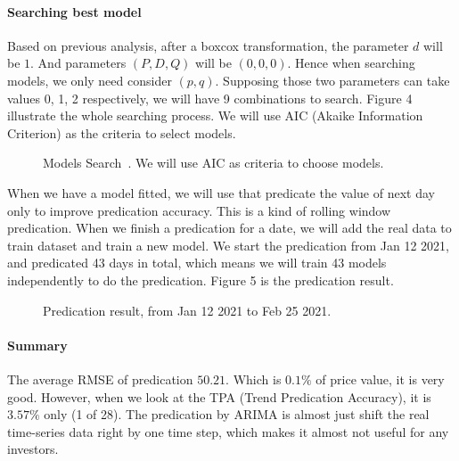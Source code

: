 \documentclass[10pt,twocolumn,letterpaper]{article}
\begin{document}
\paragraph{Searching best model}
Based on previous analysis, after a boxcox transformation, the parameter $d$ will be $1$. And parameters $(P, D, Q)$ will be $(0, 0, 0)$. Hence when searching models, we only need consider $(p, q)$. Supposing those two parameters can take values 0, 1, 2 respectively, we will have 9 combinations to search. Figure 4 illustrate the whole searching process. We will use AIC (Akaike Information Criterion) as the criteria to select models.

\begin{figure}[H]
\begin{center}
\end{center}
   \caption{Models Search~\cite{Authors08}. We will use AIC as criteria to choose models.}
\end{figure}


When we have a model fitted, we will use that predicate the value of next day only to improve predication accuracy. This is a kind of rolling window predication. When we finish a predication for a date, we will add the real data to train dataset and train a new model. We start the predication from Jan 12 2021, and predicated 43 days in total, which means we will train 43 models independently to do the predication. Figure 5 is the predication result.

\begin{figure}[H]
\begin{center}
\end{center}
   \caption{Predication result, from Jan 12 2021 to Feb 25 2021.}
\end{figure}

\paragraph{Summary}

The average RMSE of predication $50.21$. Which is $0.1\%$ of price value, it is very good. However, when we look at the TPA (Trend Predication Accuracy), it is $3.57\%$ only (1 of 28). The predication by ARIMA is almost just shift the real time-series data right by one time step, which makes it almost not useful for any investors.
\end{document}
